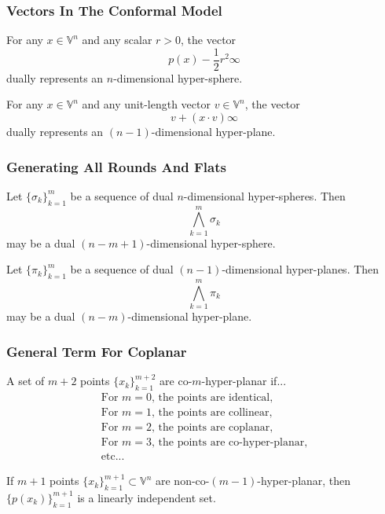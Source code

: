 \documentclass{beamer}
\newcommand{\V}{\mathbb{V}}
\newcommand{\nvai}{\infty}
\begin{document}
\begin{frame}
\frametitle{Vectors In The Conformal Model}
\begin{lemma}
For any $x\in\V^n$ and any scalar $r>0$, the vector
\begin{equation*}
p(x) - \frac{1}{2}r^2\nvai
\end{equation*}
dually represents an $n$-dimensional hyper-sphere.
\end{lemma}
\begin{lemma}
For any $x\in\V^n$ and any unit-length vector $v\in\V^n$, the vector
\begin{equation*}
v + (x\cdot v)\nvai
\end{equation*}
dually represents an $(n-1)$-dimensional hyper-plane.
\end{lemma}
\end{frame}

\begin{frame}
\frametitle{Generating All Rounds And Flats}
\begin{lemma}
Let $\{\sigma_k\}_{k=1}^m$ be a sequence of \alert{dual} $n$-dimensional hyper-spheres.
Then
\begin{equation*}
\bigwedge_{k=1}^m\sigma_k
\end{equation*}
may be a \alert{dual} $(n-m+1)$-dimensional hyper-sphere.
\end{lemma}
\begin{lemma}
Let $\{\pi_k\}_{k=1}^m$ be a sequence of \alert{dual} $(n-1)$-dimensional hyper-planes.
Then
\begin{equation*}
\bigwedge_{k=1}^m\pi_k
\end{equation*}
may be a \alert{dual} $(n-m)$-dimensional hyper-plane.
\end{lemma}
\end{frame}

\begin{frame}
\frametitle{General Term For Coplanar}
\begin{definition}
A set of $m+2$ points $\{x_k\}_{k=1}^{m+2}$ are \alert{co-$m$-hyper-planar} if...
\begin{equation*}
\begin{array}{l}
\mbox{For $m=0$, the points are identical,} \\
\mbox{For $m=1$, the points are collinear,} \\
\mbox{For $m=2$, the points are coplanar,} \\
\mbox{For $m=3$, the points are co-hyper-planar,} \\
\mbox{etc...}
\end{array}
\end{equation*}
\end{definition}
\begin{lemma}
If $m+1$ points $\{x_k\}_{k=1}^{m+1}\subset\V^n$ are non-co-$(m-1)$-hyper-planar,
then $\{p(x_k)\}_{k=1}^{m+1}$ is a linearly independent set.
\end{lemma}
\end{frame}
\end{document}
